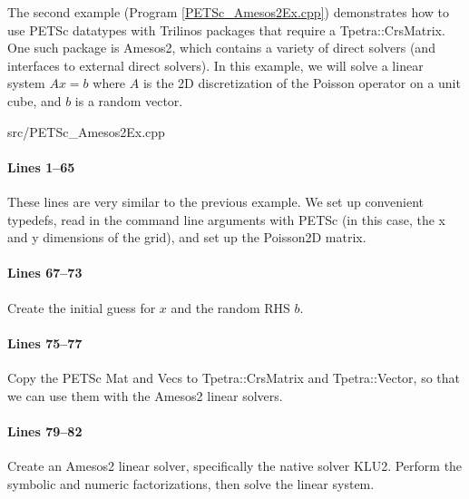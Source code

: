 The second example (Program \ref{PETSc_Amesos2Ex.cpp}) demonstrates how to use
PETSc datatypes with Trilinos packages that require a Tpetra::CrsMatrix.  One
such package is Amesos2, which contains a variety of direct solvers (and
interfaces to external direct solvers).  In this example, we will solve a linear
system $Ax=b$ where $A$ is the 2D discretization of the Poisson operator on a
unit cube, and $b$ is a random vector.

\begin{lstinputlisting}[caption=PETSc\_Amesos2Ex.cpp,label=PETSc_Amesos2Ex.cpp]{src/PETSc_Amesos2Ex.cpp}
\end{lstinputlisting}

\paragraph{Lines 1--65}
These lines are very similar to the previous example.  We set up convenient
typedefs, read in the command line arguments with PETSc (in this case, the x
and y dimensions of the grid), and set up the Poisson2D matrix.

\paragraph{Lines 67--73}
Create the initial guess for $x$ and the random RHS $b$.

\paragraph{Lines 75--77}
Copy the PETSc Mat and Vecs to Tpetra::CrsMatrix and Tpetra::Vector, so that
we can use them with the Amesos2 linear solvers.

\paragraph{Lines 79--82}
Create an Amesos2 linear solver, specifically the native solver KLU2.  Perform
the symbolic and numeric factorizations, then solve the linear system.
